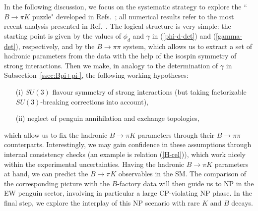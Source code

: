 \documentclass[12pt]{article}
\begin{document}
In the following discussion, we focus on the systematic
strategy to explore the ``$B\to\pi K$ puzzle"  developed in Refs.~\cite{BFRS2,BFRS3}; 
all numerical results refer to the most recent analysis presented in 
Ref.~\cite{BFRS-5}. The logical structure is very simple: the starting point is
given by the values of $\phi_d$ and $\gamma$ in (\ref{phi-d-det})
and (\ref{gamma-det}), respectively, and by the $B\to\pi\pi$ system, 
which allows us to extract a set of hadronic parameters from the data
with the help of the isospin symmetry of strong interactions. Then we make, in
analogy to the determination of $\gamma$ in Subsection~\ref{ssec:Bpi+pi-}, 
the following working hypotheses:
\begin{itemize}
\item[(i)] $SU(3)$ flavour symmetry of strong interactions (but taking factorizable 
$SU(3)$-breaking corrections into account),
\item[(ii)] neglect of penguin annihilation and exchange topologies,
\end{itemize}
which allow us to fix the hadronic $B\to\pi K$ parameters through their $B\to\pi\pi$
counterparts. Interestingly, we may gain confidence in these assumptions through 
internal consistency checks (an example is relation (\ref{H-rel})), which work nicely
within the experimental uncertainties. Having the hadronic $B\to\pi K$ parameters
at hand, we can predict the $B\to \pi K$ observables in the SM. The comparison
of the corresponding picture with the $B$-factory data will then guide us to NP
in the EW penguin sector, involving in particular a large CP-violating NP phase. In the
final step, we explore the interplay of this NP scenario with rare $K$ and $B$
decays. 


%
%
%
\boldmath
\end{document}
